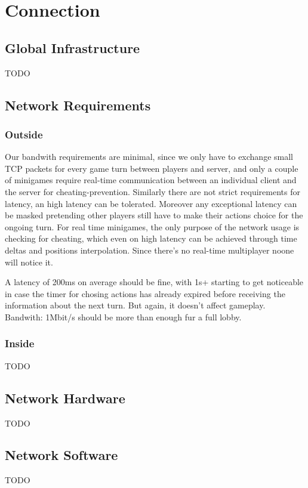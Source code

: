 \section{Connection}

\subsection{Global Infrastructure}
TODO

\subsection{Network Requirements}

\subsubsection{Outside}
Our bandwith requirements are minimal, since we only have to exchange small TCP packets for every game turn between players and server, and only a couple of minigames require real-time communication between an individual client and the server for cheating-prevention.
Similarly there are not strict requirements for latency, an high latency can be tolerated. Moreover any exceptional latency can be masked pretending other players still have to make their actions choice for the ongoing turn. For real time minigames, the only purpose of the network usage is checking for cheating, which even on high latency can be achieved through time deltas and positions interpolation. Since there's no real-time multiplayer noone will notice it.

A latency of 200ms on average should be fine, with 1s+ starting to get noticeable in case the timer for chosing actions has already expired before receiving the information about the next turn. But again, it doesn't affect gameplay.
Bandwith: 1Mbit/s should be more than enough fur a full lobby.

\subsubsection{Inside}
TODO


\subsection{Network Hardware}
TODO

\subsection{Network Software}
TODO

\pagebreak 